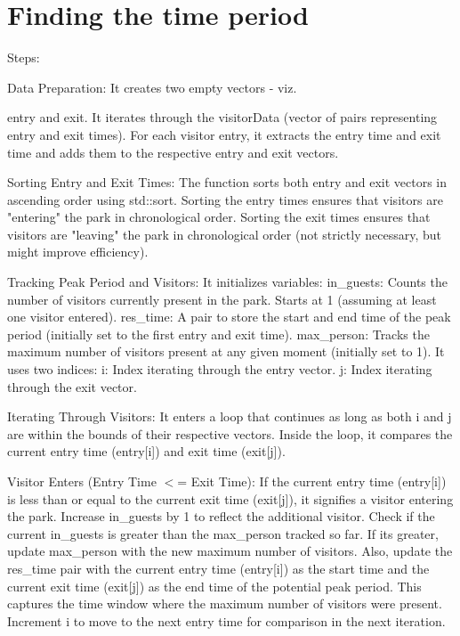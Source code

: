 \chapter{Finding the time period}
\hypertarget{md__finding_01the_01time_01period}{}\label{md__finding_01the_01time_01period}
Steps\+:
\begin{DoxyEnumerate}
\item Data Preparation\+: It creates two empty vectors -\/ viz.
\begin{DoxyItemize}
\item entry and exit. It iterates through the visitor\+Data (vector of pairs representing entry and exit times). For each visitor entry, it extracts the entry time and exit time and adds them to the respective entry and exit vectors.
\end{DoxyItemize}
\item Sorting Entry and Exit Times\+: The function sorts both entry and exit vectors in ascending order using std\+::sort. Sorting the entry times ensures that visitors are "{}entering"{} the park in chronological order. Sorting the exit times ensures that visitors are "{}leaving"{} the park in chronological order (not strictly necessary, but might improve efficiency).
\item Tracking Peak Period and Visitors\+: It initializes variables\+: in\+\_\+guests\+: Counts the number of visitors currently present in the park. Starts at 1 (assuming at least one visitor entered). res\+\_\+time\+: A pair to store the start and end time of the peak period (initially set to the first entry and exit time). max\+\_\+person\+: Tracks the maximum number of visitors present at any given moment (initially set to 1). It uses two indices\+: i\+: Index iterating through the entry vector. j\+: Index iterating through the exit vector.
\item Iterating Through Visitors\+: It enters a loop that continues as long as both i and j are within the bounds of their respective vectors. Inside the loop, it compares the current entry time (entry\mbox{[}i\mbox{]}) and exit time (exit\mbox{[}j\mbox{]}).
\item Visitor Enters (Entry Time \texorpdfstring{$<$}{<}= Exit Time)\+: If the current entry time (entry\mbox{[}i\mbox{]}) is less than or equal to the current exit time (exit\mbox{[}j\mbox{]}), it signifies a visitor entering the park. Increase in\+\_\+guests by 1 to reflect the additional visitor. Check if the current in\+\_\+guests is greater than the max\+\_\+person tracked so far. If it\textquotesingle{}s greater, update max\+\_\+person with the new maximum number of visitors. Also, update the res\+\_\+time pair with the current entry time (entry\mbox{[}i\mbox{]}) as the start time and the current exit time (exit\mbox{[}j\mbox{]}) as the end time of the potential peak period. This captures the time window where the maximum number of visitors were present. Increment i to move to the next entry time for comparison in the next iteration.

\end{DoxyEnumerate}
